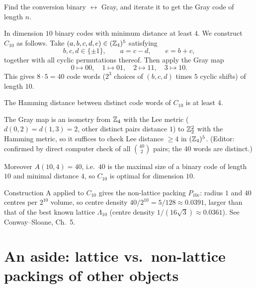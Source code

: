\begin{exercise}
Find the conversion binary $\leftrightarrow$ Gray, and iterate it to get the Gray code of length $n$.
\end{exercise}

In dimension $10$  binary codes with minimum distance at least $4$. We construct
$C_{10}$ as follows. Take $(a,b,c,d,e)\in(\mathbb{Z}_4)^5$ satisfying
\[
  b,c,d\in\{\pm1\},\qquad a = c-d,\qquad e = b+c,
\]
together with all cyclic permutations thereof. Then apply the Gray map
\[
  0\mapsto 00,\quad 1\mapsto 01,\quad 2\mapsto 11,\quad 3\mapsto 10.
\]
This gives $8\cdot5=40$ code words ($2^3$ choices of $(b,c,d)$ times $5$ cyclic shifts) of length $10$.

\begin{claim}
The Hamming distance between distinct code words of $C_{10}$ is at least $4$.
\end{claim}
\begin{addedblock}
The Gray map is an isometry from $\mathbb{Z}_4$ with the Lee metric ($d(0,2)=d(1,3)=2$, other distinct pairs
distance $1$) to $\mathbb{Z}_2^2$ with the Hamming metric, so it suffices to check Lee distance $\ge4$ in $(\mathbb{Z}_4)^5$.
(Editor: confirmed by direct computer check of all $\binom{40}{2}$ pairs; the $40$ words are distinct.)
\end{addedblock}

Moreover $A(10,4)=40$, i.e.\ $40$ is the maximal size of a binary code of length $10$ and minimal
distance $4$, so $C_{10}$ is optimal for dimension $10$.
\begin{addedblock}
Construction A applied to $C_{10}$ gives the non-lattice packing $P_{10c}$: radius $1$ and $40$ centres
per $2^{10}$ volume, so centre density $40/2^{10}=5/128\approx0.0391$, larger than that of the best known
lattice $\Lambda_{10}$ (centre density $1/(16\sqrt3)\approx0.0361$). See Conway--Sloane, Ch.~5.
\end{addedblock}

\section{An aside: lattice vs.\ non-lattice packings of other objects}
\label{L04b:sec:aside}

